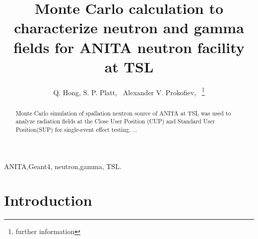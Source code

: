 \documentclass[12pt,journal]{IEEEtran}
\begin{document}
\title{Monte Carlo calculation to characterize neutron and gamma fields for ANITA neutron facility at TSL}

\author{Q. Hong,
S. P. Platt,~
Alexander V. Prokofiev,~
\thanks{further information}\\[2mm] 	%
\vspace{-5mm}
}



\maketitle %


\begin{abstract}
Monte Carlo simulation of spallation neutron source of ANITA at TSL was used to analyze radiation fields at the Close User Position (CUP) and Standard User Position(SUP) for single-event effect testing. ...
\end{abstract}

\begin{IEEEkeywords}
ANITA,Geant4, neutron,gamma, TSL.
\end{IEEEkeywords}


\IEEEpeerreviewmaketitle

\section{Introduction}
\end{document}
